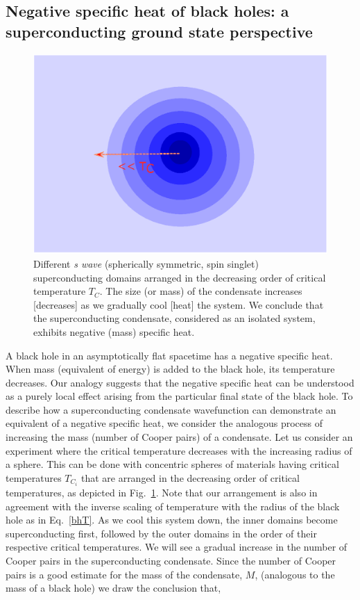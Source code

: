 \documentclass[10pt,letterpaper,aps,onecolumn,superscriptaddress,floatfix,notitlepage]{revtex4-1}
\begin{document}
	\subsection{Negative specific heat of black holes: a superconducting ground state perspective}
	\begin{figure}
		\includegraphics[scale=0.5]{fig7.eps}  		\caption{Different \textit{s wave} (spherically symmetric, spin singlet) superconducting domains arranged in the decreasing order of critical temperature $T_{C}$. The size (or mass) of the condensate increases [decreases] as we gradually cool [heat] the system. We conclude that the superconducting condensate, considered as an isolated system, exhibits negative (mass) specific heat.\label{scT}} 
	\end{figure}
	A black hole in an asymptotically flat spacetime has a negative specific heat. When mass (equivalent of energy) is added to the black hole, its temperature decreases. Our analogy suggests that the negative specific heat can be understood as a purely local effect arising from the particular final state of the black hole. To describe how a superconducting condensate wavefunction can demonstrate an equivalent of a negative specific heat, we consider the analogous process of increasing the mass (number of Cooper pairs) of a condensate.  Let us consider an experiment where the critical temperature decreases with the increasing radius of a sphere. This can be done with concentric spheres of materials having critical temperatures $T_{C_{i}}$ that are arranged in the decreasing order of critical temperatures,  as depicted in Fig.~\ref{scT}. Note that our arrangement is also in agreement with the inverse scaling of temperature with the radius of the black hole as in Eq.~\eqref{bhT}. As we cool this system down, the inner domains become superconducting first, followed by the outer domains in the order of their respective critical temperatures. We will see a gradual increase in the number of Cooper pairs in the superconducting condensate.  Since the number of Cooper pairs is a good estimate for the mass of the condensate, $M$, (analogous to the mass of a black hole) we draw the conclusion that,
\end{document}
